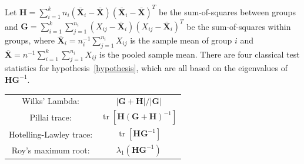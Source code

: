 \documentclass[12pt]{article} %
\DeclareMathOperator{\mytr}{tr}
\newcommand{\bX}{\mathbf{X}}
\newcommand{\bH}{\mathbf{H}}
\newcommand{\bG}{\mathbf{G}}
\theoremstyle{definition}
\begin{document}
Let $\bH=\sum_{i=1}^k n_i (\bar{\bX}_i-\bar{\bX})(\bar{\bX}_i-\bar{\bX})^T$ be the sum-of-squares between groups and $\bG=\sum_{i=1}^k \sum_{j=1}^{n_i}(X_{ij}-\bar{\bX}_i)(X_{ij}-\bar{\bX}_i)^T$ be the sum-of-squares within groups, where $\bar{\bX}_i=n_i^{-1}\sum_{j=1}^{n_i}X_{ij}$ is the sample mean of group $i$ and $\bar{\bX}=n^{-1}\sum_{i=1}^k\sum_{j=1}^{n_i}X_{ij}$ is the pooled sample mean.
   There are four classical test statistics for hypothesis~\eqref{hypothesis}, which are all based on the eigenvalues of $\bH\bG^{-1}$. 


       \begin{center}
       \begin{tabular}{|cc|}
           \hline
       {Wilks' Lambda:} & $|\bG+\bH|/|\bG|$\\
       {Pillai trace:} & $\mytr[\bH(\bG+\bH)^{-1}]$\\
       {Hotelling-Lawley trace:} & $\mytr[\bH \bG^{-1}]$\\
       {Roy's maximum root:} & $\lambda_{1}(\bH \bG^{-1})$\\
           \hline
           \end{tabular}
       \end{center}

\end{document}
